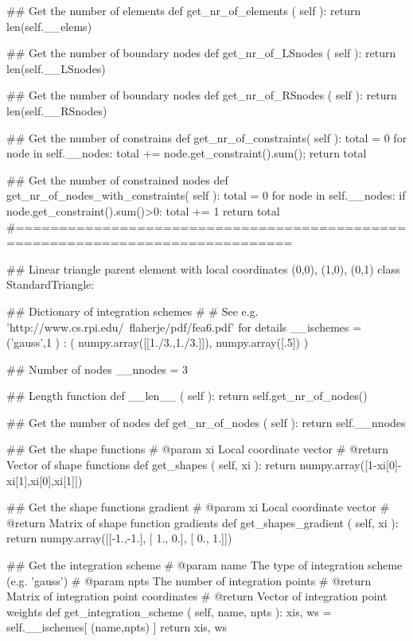 \begin{appendices}
\begin{spverbatim}
    ## Get the number of elements
    def get_nr_of_elements ( self ):
        return len(self.__elems)
        
    ## Get the number of boundary nodes
    def get_nr_of_LSnodes ( self ):
        return len(self.__LSnodes)
        
    ## Get the number of boundary nodes
    def get_nr_of_RSnodes ( self ):
        return len(self.__RSnodes)

    ## Get the number of constrains
    def get_nr_of_constraints( self ):
        total = 0
        for node in self.__nodes:
            total += node.get_constraint().sum();
        return total

    ## Get the number of constrained nodes
    def get_nr_of_nodes_with_constraints( self ):
        total = 0
        for node in self.__nodes:
            if node.get_constraint().sum()>0:
                total += 1
        return total
#==============================================================================
    
##  Linear triangle parent element with local coordinates (0,0), (1,0), (0,1)
class StandardTriangle:
    
    ## Dictionary of integration schemes
    #
    #  See e.g. 'http://www.cs.rpi.edu/~flaherje/pdf/fea6.pdf' for details
    __ischemes = {
                   ('gauss',1 ) : ( numpy.array([[1./3.,1./3.]]),
                                    numpy.array([.5]) )
                 }

    ## Number of nodes
    __nnodes = 3

    ## Length function
    def __len__ ( self ):
        return self.get_nr_of_nodes()

    ## Get the number of nodes
    def get_nr_of_nodes ( self ):
        return self.__nnodes

    ## Get the shape functions
    #  @param  xi Local coordinate vector
    #  @return    Vector of shape functions
    def get_shapes ( self, xi ):
        return numpy.array([1-xi[0]-xi[1],xi[0],xi[1]])

    ## Get the shape functions gradient
    #  @param  xi Local coordinate vector
    #  @return    Matrix of shape function gradients
    def get_shapes_gradient ( self, xi ):
        return numpy.array([[-1.,-1.],
                            [ 1., 0.],
                            [ 0., 1.]])

    ## Get the integration scheme
    #  @param  name The type of integration scheme (e.g. 'gauss')
    #  @param  npts The number of integration points
    #  @return      Matrix of integration point coordinates
    #  @return      Vector of integration point weights
    def get_integration_scheme ( self, name, npts ):
        xis, ws = self.__ischemes[ (name,npts) ]
        return xis, ws


\end{spverbatim}
\end{appendices}
